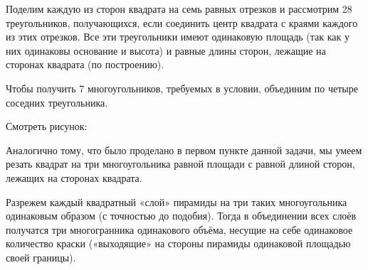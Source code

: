 \begin{itemize}
\itA Поделим каждую из сторон квадрата на семь равных отрезков и рассмотрим 28 треугольников, получающихся, если соединить центр квадрата с краями каждого из этих отрезков. Все эти треугольники имеют одинаковую площадь (так как у них одинаковы основание и высота) и равные длины сторон, лежащие на сторонах квадрата (по построению).

Чтобы получить 7 многоугольников, требуемых в условии, объединим по четыре соседних треугольника.

\itB Смотреть рисунок:

\begin{center}\end{center}

\itC Аналогично тому, что было проделано в первом пункте данной задачи, мы умеем резать квадрат на три многоугольника равной площади с равной длиной сторон, лежащих на сторонах квадрата.

Разрежем каждый квадратный «слой» пирамиды на три таких многоугольника одинаковым образом (с точностью до подобия). Тогда в объединении всех слоёв получатся три многогранника одинакового объёма, несущие на себе одинаковое количество краски («выходящие» на стороны пирамиды одинаковой площадью своей границы).
\end{itemize}